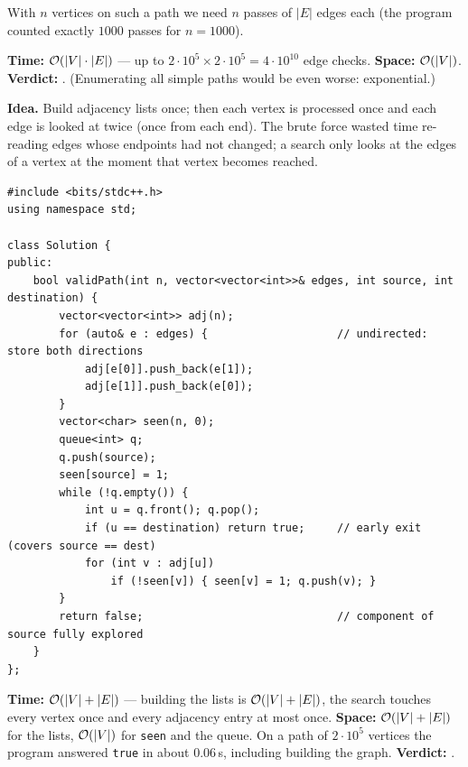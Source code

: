 \begin{bruteforcebox}
With $n$ vertices on such a path we need $n$ passes of $|E|$ edges each (the program counted exactly $1000$ passes for $n = 1000$).

\begin{complexitybox}
\textbf{Time:} $\mathcal{O}(|V| \cdot |E|)$ --- up to $2\cdot10^5 \times 2\cdot10^5 = 4\cdot10^{10}$ edge checks. \textbf{Space:} $\mathcal{O}(|V|)$. \textbf{Verdict:} \tle{}. (Enumerating all simple paths would be even worse: exponential.)
\end{complexitybox}
\end{bruteforcebox}

\begin{algorithmbox}
\textbf{Idea.} Build adjacency lists once; then each vertex is processed once and each edge is looked at twice (once from each end). The brute force wasted time re-reading edges whose endpoints had not changed; a search only looks at the edges of a vertex at the moment that vertex becomes reached.

\begin{lstlisting}[style=cpp]
#include <bits/stdc++.h>
using namespace std;

class Solution {
public:
    bool validPath(int n, vector<vector<int>>& edges, int source, int destination) {
        vector<vector<int>> adj(n);
        for (auto& e : edges) {                    // undirected: store both directions
            adj[e[0]].push_back(e[1]);
            adj[e[1]].push_back(e[0]);
        }
        vector<char> seen(n, 0);
        queue<int> q;
        q.push(source);
        seen[source] = 1;
        while (!q.empty()) {
            int u = q.front(); q.pop();
            if (u == destination) return true;     // early exit (covers source == dest)
            for (int v : adj[u])
                if (!seen[v]) { seen[v] = 1; q.push(v); }
        }
        return false;                              // component of source fully explored
    }
};
\end{lstlisting}

\begin{complexitybox}
\textbf{Time:} $\mathcal{O}(|V| + |E|)$ --- building the lists is $\mathcal{O}(|V|+|E|)$, the search touches every vertex once and every adjacency entry at most once. \textbf{Space:} $\mathcal{O}(|V|+|E|)$ for the lists, $\mathcal{O}(|V|)$ for \texttt{seen} and the queue. On a path of $2\cdot 10^5$ vertices the program answered \texttt{true} in about $0.06$\,s, including building the graph. \textbf{Verdict:} \ac{}.
\end{complexitybox}
\end{algorithmbox}

